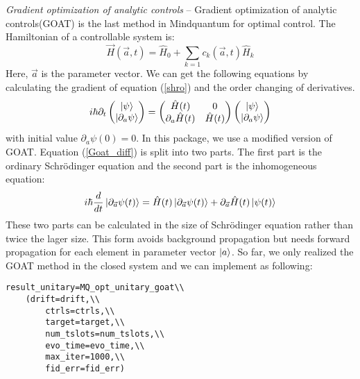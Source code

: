 \textit{Gradient optimization of analytic controls} -- Gradient optimization of analytic controls(GOAT) is the last method in Mindquantum for optimal control. The Hamiltonian of a controllable system is:
\begin{equation}
    \vec{H}(\vec{a},t)=\hat{H}_{0}+\sum_{k=1}c_{k}(\vec{a},t)\hat{H}_{k}
\end{equation}
Here, $\vec{a}$ is the parameter vector. We can get the following equations by calculating the gradient of equation (\ref{shro}) and the order changing of derivatives.
\begin{equation}
    i\hbar\partial_{t}
    \begin{pmatrix}
        \ket{\psi} \\
        \ket{\partial_{a}\psi}
    \end{pmatrix}
    =
    \begin{pmatrix}
        \hat{H}(t) & 0 \\
        \partial_{a}\hat{H}(t) & \hat{H}(t)
    \end{pmatrix}
    \begin{pmatrix}
        \ket{\psi} \\
        \ket{\partial_{a}\psi}
    \end{pmatrix}
    \label{Goat_diff}
\end{equation}
with initial value $\partial_{a}\psi(0)=0$. In this package, we use a modified version of GOAT. Equation (\ref{Goat_diff}) is split into two parts. The first part is the ordinary Schrödinger equation and the second part is the inhomogeneous equation:
\begin{equation}
    i\hbar\frac{d}{dt}\ket{\partial_{\vec{a}}\psi(t)}=\hat{H}(t)\ket{\partial_{\vec{a}}\psi(t)}+\partial_{\vec{a}}\hat{H}(t)\ket{\psi(t)}
\end{equation}
These two parts can be calculated in the size of Schrödinger equation rather than twice the lager size. This form avoids background propagation but needs forward propagation for each element in parameter vector $\ket{a}$. So far, we only realized the GOAT method in the closed system and we can implement as following:
\begin{lstlisting}
result_unitary=MQ_opt_unitary_goat\\
    (drift=drift,\\
        ctrls=ctrls,\\
        target=target,\\
        num_tslots=num_tslots,\\
        evo_time=evo_time,\\
        max_iter=1000,\\
        fid_err=fid_err)
\end{lstlisting}

